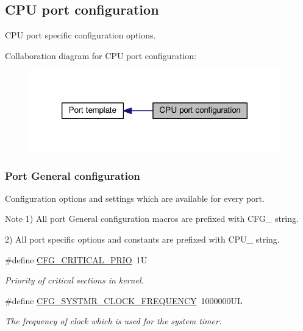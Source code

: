 \hypertarget{group__template__cpu__cfg}{\subsection{C\-P\-U port configuration}
\label{group__template__cpu__cfg}
}


C\-P\-U port specific configuration options.  


Collaboration diagram for C\-P\-U port configuration\-:\nopagebreak
\begin{figure}[H]
\begin{center}
\leavevmode
\includegraphics[width=308pt]{group__template__cpu__cfg}
\end{center}
\end{figure}
\subsubsection*{Port General configuration}
\label{_amgrp9c3e546b5e2363305cd8bbe88e9dd530}%
Configuration options and settings which are available for every port.

\begin{DoxyNote}{Note}
1) All port General configuration macros are prefixed with {\ttfamily C\-F\-G\-\_\-} string. 

2) All port specific options and constants are prefixed with {\ttfamily C\-P\-U\-\_\-} string. 
\end{DoxyNote}
\begin{DoxyCompactItemize}
\item 
\#define \hyperlink{group__template__cpu__cfg_gab2277007c357c09ba619a5e2f9b00bd9}{C\-F\-G\-\_\-\-C\-R\-I\-T\-I\-C\-A\-L\-\_\-\-P\-R\-I\-O}~1\-U
\begin{DoxyCompactList}\small\item\em Priority of critical sections in kernel. \end{DoxyCompactList}\item 
\#define \hyperlink{group__template__cpu__cfg_gac85c592962ba2c968d13f867533196a1}{C\-F\-G\-\_\-\-S\-Y\-S\-T\-M\-R\-\_\-\-C\-L\-O\-C\-K\-\_\-\-F\-R\-E\-Q\-U\-E\-N\-C\-Y}~1000000\-U\-L
\begin{DoxyCompactList}\small\item\em The frequency of clock which is used for the system timer. \end{DoxyCompactList}\end{DoxyCompactItemize}


